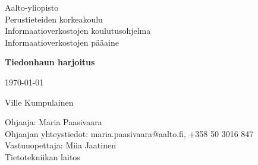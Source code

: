 \begin{titlepage}

	\begin{flushleft}
	\begin{minipage}{10cm}
		\linespread{1.0}\small
		Aalto-yliopisto \\
		Perustieteiden korkeakoulu \\
		Informaatioverkostojen koulutusohjelma \\
		Informaatioverkostojen pääaine
		\par
	\end{minipage}
	\end{flushleft}
	\centering
	\vspace{1.5cm}
	{\large\bfseries Tiedonhaun harjoitus \par}
	\vspace{1.5cm}
	{\large \today\par}
	{\Large Ville Kumpulainen \par}
	\vfill

	\begin{flushleft}
	\begin{minipage}{10cm}
		\linespread{1.0}\small
		Ohjaaja: Maria Paasivaara\\
		Ohjaajan yhteystiedot: maria.paasivaara@aalto.fi, +358 50 3016 847 \\
		Vastuuopettaja: Miia Jaatinen \\
		Tietotekniikan laitos
		\par
	\end{minipage}
	\end{flushleft}


\end{titlepage}
